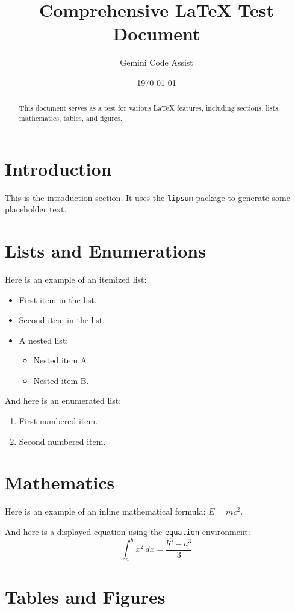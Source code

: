 \documentclass{article}
\title{Comprehensive LaTeX Test Document}
\author{Gemini Code Assist}
\date{\today}
\begin{document}
\maketitle

\begin{abstract}
This document serves as a test for various LaTeX features, including sections, lists, mathematics, tables, and figures.
\end{abstract}

\section{Introduction}
This is the introduction section. It uses the \texttt{lipsum} package to generate some placeholder text.
\lipsum[1]

\section{Lists and Enumerations}
Here is an example of an itemized list:
\begin{itemize}
    \item First item in the list.
    \item Second item in the list.
    \item A nested list:
    \begin{itemize}
        \item Nested item A.
        \item Nested item B.
    \end{itemize}
\end{itemize}

And here is an enumerated list:
\begin{enumerate}
    \item First numbered item.
    \item Second numbered item.
\end{enumerate}

\section{Mathematics}
Here is an example of an inline mathematical formula: $E = mc^2$.

And here is a displayed equation using the \texttt{equation} environment:
\begin{equation}
    \int_{a}^{b} x^2 \,dx = \frac{b^3 - a^3}{3}
\end{equation}

\section{Tables and Figures}
\end{document}
